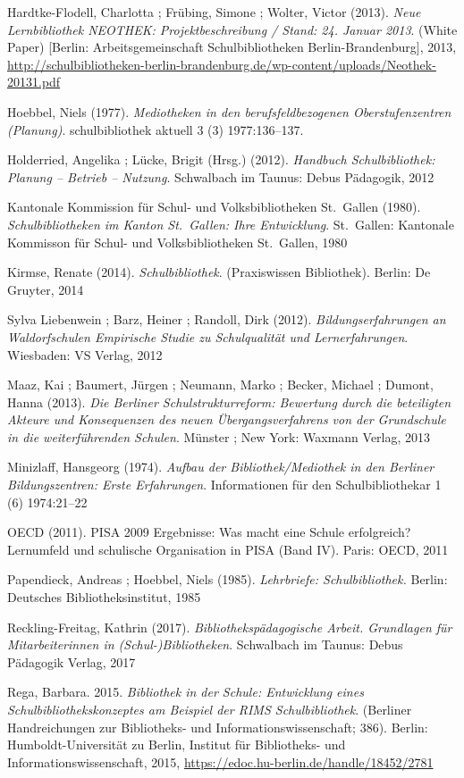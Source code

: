 \documentclass[a4paper,
fontsize=11pt,
oneside,
numbers=noperiodatend,
parskip=half-,
bibliography=totoc,
final
]{scrartcl}
\begin{document}
Hardtke-Flodell, Charlotta ; Frübing, Simone ; Wolter, Victor (2013).
\emph{Neue Lernbibliothek NEOTHEK: Projektbeschreibung / Stand: 24.
Januar 2013}. (White Paper) {[}Berlin: Arbeitsgemeinschaft
Schulbibliotheken Berlin-Brandenburg{]}, 2013,
\url{http://schulbibliotheken-berlin-brandenburg.de/wp-content/uploads/Neothek-20131.pdf}

Hoebbel, Niels (1977). \emph{Mediotheken in den berufsfeldbezogenen
Oberstufenzentren (Planung)}. schulbibliothek aktuell 3 (3)
1977:136--137.

Holderried, Angelika ; Lücke, Brigit (Hrsg.) (2012). \emph{Handbuch
Schulbibliothek: Planung -- Betrieb -- Nutzung}. Schwalbach im Taunus:
Debus Pädagogik, 2012

Kantonale Kommission für Schul- und Volksbibliotheken St.~Gallen (1980).
\emph{Schulbibliotheken im Kanton St.~Gallen: Ihre Entwicklung}.
St.~Gallen: Kantonale Kommisson für Schul- und Volksbibliotheken
St.~Gallen, 1980

Kirmse, Renate (2014). \emph{Schulbibliothek}. (Praxiswissen
Bibliothek). Berlin: De Gruyter, 2014

Sylva Liebenwein ; Barz, Heiner ; Randoll, Dirk (2012).
\emph{Bildungserfahrungen an Waldorfschulen Empirische Studie zu
Schulqualität und Lernerfahrungen}. Wiesbaden: VS Verlag, 2012

Maaz, Kai ; Baumert, Jürgen ; Neumann, Marko ; Becker, Michael ; Dumont,
Hanna (2013). \emph{Die Berliner Schulstrukturreform: Bewertung durch
die beteiligten Akteure und Konsequenzen des neuen Übergangsverfahrens
von der Grundschule in die weiterführenden Schulen}. Münster ; New York:
Waxmann Verlag, 2013

Minizlaff, Hansgeorg (1974). \emph{Aufbau der Bibliothek/Mediothek in
den Berliner Bildungszentren: Erste Erfahrungen}. Informationen für den
Schulbibliothekar 1 (6) 1974:21--22

OECD (2011). PISA 2009 Ergebnisse: Was macht eine Schule erfolgreich?
Lernumfeld und schulische Organisation in PISA (Band IV). Paris: OECD,
2011

Papendieck, Andreas ; Hoebbel, Niels (1985). \emph{Lehrbriefe:
Schulbibliothek.} Berlin: Deutsches Bibliotheksinstitut, 1985

Reckling-Freitag, Kathrin (2017). \emph{Bibliothekspädagogische Arbeit.
Grundlagen für Mitarbeiterinnen in (Schul-)Bibliotheken}. Schwalbach im
Taunus: Debus Pädagogik Verlag, 2017

Rega, Barbara. 2015. \emph{Bibliothek in der Schule: Entwicklung eines
Schulbibliothekskonzeptes am Beispiel der RIMS Schulbibliothek}.
(Berliner Handreichungen zur Bibliotheks- und Informationswissenschaft;
386). Berlin: Humboldt-Universität zu Berlin, Institut für Bibliotheks-
und Informationswissenschaft, 2015,
\url{https://edoc.hu-berlin.de/handle/18452/2781}
\end{document}
